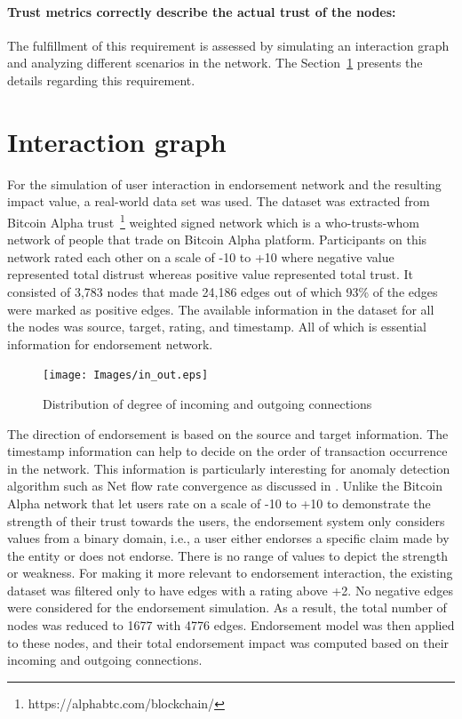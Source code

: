 \paragraph{Trust metrics correctly describe the actual trust of the nodes:}The
fulfillment of this requirement is assessed by simulating an interaction graph
and analyzing different scenarios in the network. The
Section~\ref{sec:interaction} presents the details regarding this requirement. 
\section{Interaction graph} \label{sec:interaction}
For the simulation of user interaction in endorsement network and the resulting
impact value, a real-world data set was used. The dataset was extracted from
Bitcoin Alpha trust~\footnote{https://alphabtc.com/blockchain/} weighted signed
network which is a who-trusts-whom network of people that trade on Bitcoin
Alpha platform. Participants on this network rated each other on a scale of -10
to +10 where negative value represented total distrust whereas positive value
represented total trust. It consisted of 3,783 nodes that made 24,186 edges out
of which 93\% of the edges were marked as positive edges\cite{kumar2016edge}.
The available information in the dataset for all the nodes was source, target,
rating, and timestamp. All of which is essential information for endorsement
network.
\begin{figure}
	\texttt{[image: Images/in\_out.eps]} 
	\caption{Distribution of degree of incoming and outgoing connections} 
	\label{inOut}
\end{figure}
The direction of endorsement is based on the source and target information.
The timestamp information can help to decide on the order of transaction
occurrence in the network. This information is particularly interesting for
anomaly detection algorithm such as Net flow rate convergence as discussed in
\cite{buechler2015decentralized}. Unlike the Bitcoin Alpha network that let
users rate on a scale of -10 to +10 to demonstrate the strength of their trust
towards the users, the endorsement system only considers values from a binary
domain, i.e., a user either endorses a specific claim made by the entity or
does not endorse. There is no range of values to depict the strength or
weakness. For making it more relevant to endorsement interaction, the existing
dataset was filtered only to have edges with a rating above +2. No negative
edges were considered for the endorsement simulation. As a result, the total
number of nodes was reduced to 1677 with 4776 edges. Endorsement model was then
applied to these nodes, and their total endorsement impact was computed based
on their incoming and outgoing connections. 

